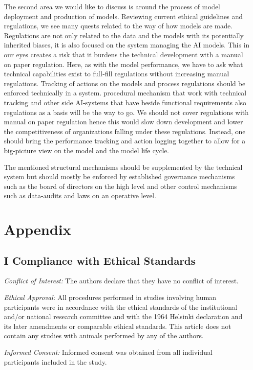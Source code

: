 \documentclass[jou,apacite]{apa6}
\begin{document}
The second area we would like to discuss is around the process of model deployment and production of models. Reviewing current ethical guidelines and regulations, we see many quests related to the way of how models are made. Regulations are not only related to the data and the models with its potentially inherited biases, it is also focused on the system managing the AI models. This in our eyes creates a risk that it burdens the technical development with a manual on paper regulation. Here, as with the model performance, we have to ask what technical capabilities exist to full-fill regulations without increasing manual regulations. Tracking of actions on the models and process regulations should be enforced technically in a system. procedural mechanism that work with technical tracking and other side AI-systems that have beside functional requirements also regulations as a basis will be the way to go. We should not cover regulations with manual on paper regulation hence this would slow down development and lower the competitiveness of organizations falling under these regulations. Instead, one should bring the performance tracking and action logging together to allow for a big-picture view on the model and the model life cycle.\par

The mentioned structural mechanisms should be supplemented by the technical system but should mostly be enforced by established governance mechanisms such as the board of directors on the high level and other control mechanisms such as data-audits and laws on an operative level.




\section{Appendix}

\subsection{I Compliance with Ethical Standards}
\textit{Conflict of Interest:} The authors declare that they have no conflict of
interest.\par
\textit{Ethical Approval:} All procedures performed in studies involving human
participants were in accordance with the ethical standards of the institutional
and/or national research committee and with the 1964 Helsinki
declaration and its later amendments or comparable ethical standards.
This article does not contain any studies with animals performed by
any of the authors.\par
\textit{Informed Consent:} Informed consent was obtained from all individual
participants included in the study.
\end{document}
